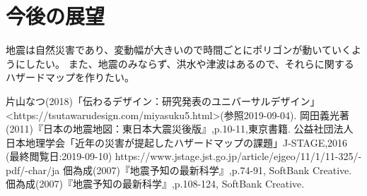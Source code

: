 \documentclass[report]{jsbook}
\begin{document}
\chapter{今後の展望}
地震は自然災害であり、変動幅が大きいので時間ごとにポリゴンが動いていくようにしたい。
また、地震のみならず、洪水や津波はあるので、それらに関するハザードマップを作りたい。
\begin{thebibliography}{9}
片山なつ(2018)「伝わるデザイン：研究発表のユニバーサルデザイン」
  <https://tsutawarudesign.com/miyasuku5.html>(参照2019-09-04).
岡田義光著(2011)『日本の地震地図：東日本大震災後版』,p.10-11,東京書籍.
公益社団法人日本地理学会「近年の災害が提起したハザードマップの課題」J-STAGE,2016 (最終閲覧日:2019-09-10)
  https://www.jstage.jst.go.jp/article/ejgeo/11/1/11-325/-pdf/-char/ja
佃為成(2007)『地震予知の最新科学』,p.74-91, SoftBank Creative.
佃為成(2007)『地震予知の最新科学』,p.108-124, SoftBank Creative.
  \end{thebibliography}

      
\end{document}

